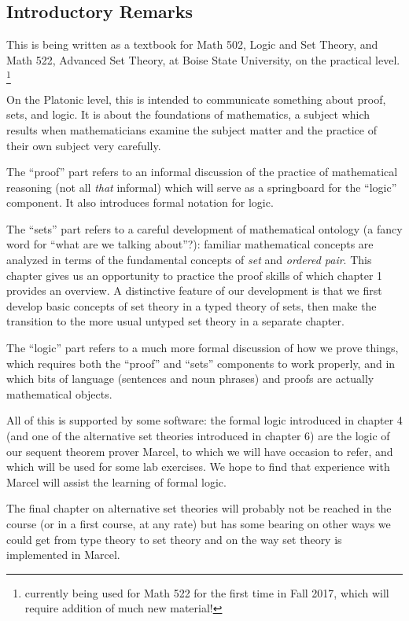 \documentclass[12pt]{book}
\begin{document}
\newpage

\subsection{Introductory Remarks}

This is being written as a textbook for Math 502, Logic and Set Theory, and Math 522, Advanced Set Theory,
at Boise State University, on the practical level.  \footnote{currently being used for Math 522 for the first time in Fall 2017, which will require addition of much new material!}

On the Platonic level, this is intended to communicate something about
proof, sets, and logic.  It is about the foundations of mathematics, a
subject which results when mathematicians examine the subject matter
and the practice of their own subject very carefully.

The ``proof'' part refers to an informal discussion of the practice of mathematical reasoning (not all {\em that\/} informal) which will serve as a
springboard for the ``logic'' component.  It also introduces formal
notation for logic.

The ``sets'' part refers to a careful development of mathematical
ontology (a fancy word for ``what are we talking about''?): familiar
mathematical concepts are analyzed in terms of the fundamental concepts 
of {\em set\/} and {\em ordered pair\/}.  This chapter gives us an opportunity to practice
the proof skills of which chapter 1 provides an overview.  A
distinctive feature of our development is that we first develop basic
concepts of set theory in a typed theory of sets, then make the
transition to the more usual untyped set theory in a separate chapter.

The ``logic'' part refers to a much more formal discussion of how we
prove things, which requires both the ``proof'' and ``sets''
components to work properly, and in which bits of language (sentences
and noun phrases) and proofs are actually mathematical objects.

All of this is supported by some software: the formal logic introduced
in chapter 4  (and one of the alternative set theories introduced in
chapter 6) are the logic of our sequent theorem prover Marcel, to
which we will have occasion to refer, and which will be used for some
lab exercises.  We hope to find that experience with Marcel will
assist the learning of formal logic.

The final chapter on alternative set theories will probably not be
reached in the course (or in a first course, at any rate) but has some bearing on other ways we could get
from type theory to set theory and on the way set theory is
implemented in Marcel.
\end{document}

